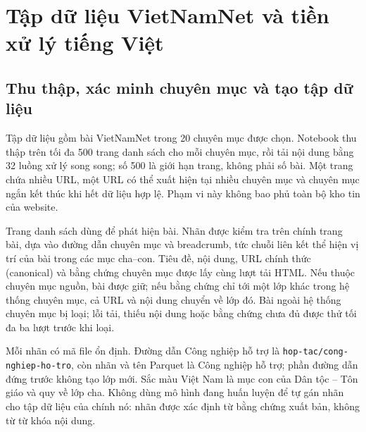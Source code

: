 \chapter{Tập dữ liệu VietNamNet và tiền xử lý tiếng Việt}\label{chap:data}
\FloatBarrier
\section{Thu thập, xác minh chuyên mục và tạo tập dữ liệu}
Tập dữ liệu gồm bài VietNamNet trong 20 chuyên mục được chọn. Notebook thu thập trên tối đa 500 trang danh sách cho mỗi chuyên mục, rồi tải nội dung bằng 32 luồng xử lý song song; số 500 là giới hạn trang, không phải số bài. Một trang chứa nhiều URL, một URL có thể xuất hiện tại nhiều chuyên mục và chuyên mục ngắn kết thúc khi hết dữ liệu hợp lệ. Phạm vi này không bao phủ toàn bộ kho tin của website.

Trang danh sách dùng để phát hiện bài. Nhãn được kiểm tra trên chính trang bài, dựa vào đường dẫn chuyên mục và breadcrumb, tức chuỗi liên kết thể hiện vị trí của bài trong các mục cha--con. Tiêu đề, nội dung, URL chính thức (canonical) và bằng chứng chuyên mục được lấy cùng lượt tải HTML. Nếu thuộc chuyên mục nguồn, bài được giữ; nếu bằng chứng chỉ tới một lớp khác trong hệ thống chuyên mục, cả URL và nội dung chuyển về lớp đó. Bài ngoài hệ thống chuyên mục bị loại; lỗi tải, thiếu nội dung hoặc bằng chứng chưa đủ được thử tối đa ba lượt trước khi loại.

Mỗi nhãn có mã file ổn định. Đường dẫn Công nghiệp hỗ trợ là \texttt{hop-tac/}\allowbreak\texttt{cong-nghiep-ho-tro}, còn nhãn và tên Parquet là Công nghiệp hỗ trợ; phần đường dẫn đứng trước không tạo lớp mới. Sắc màu Việt Nam là mục con của Dân tộc -- Tôn giáo và quy về lớp cha. Không dùng mô hình đang huấn luyện để tự gán nhãn cho tập dữ liệu của chính nó: nhãn được xác định từ bằng chứng xuất bản, không từ từ khóa nội dung.

